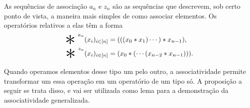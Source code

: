 As sequências de associação $a_n$ e $z_n$ são as sequências que descrevem, sob certo ponto de vista, a maneira mais simples de como associar elementos. Os operatórios relativos a elas têm a forma
	\begin{align*}
	\bigopb\nolimits^{a_n} (x_i)_{i \in [n]} &= (((x_0 \opb x_1) \cdots ) \opb x_{n-1}), \\
	\bigopb\nolimits^{z_n} (x_i)_{i \in [n]} &=  (x_{0} \opb ( \cdots (x_{n-2} \opb x_{n-1}))).
	\end{align*}

Quando operamos elementos desse tipo um pelo outro, a associatividade permite transformar um essa operação em um operatório de um tipo só. A proposição a seguir se trata disso, e vai ser utilizada como lema para a demonstração da associatividade generalizada.

